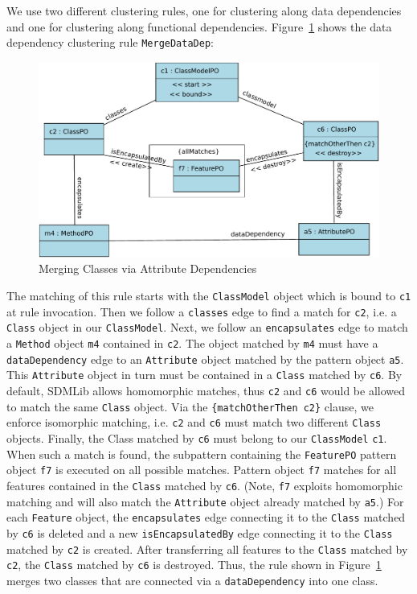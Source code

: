 \documentclass[submission,copyright,creativecommons]{eptcs}
\begin{document}
We use two different clustering rules, one for clustering along data dependencies 
and one for clustering along functional dependencies. Figure~\ref{fig:MergeAttributeRule} 
shows the data dependency clustering rule \texttt{MergeDataDep}: 

\begin{figure}[ht] \centering
	\includegraphics[width=\linewidth]{images/RuleMergeDataDep.pdf}
 \caption{Merging Classes via Attribute Dependencies}
 \label{fig:MergeAttributeRule}
\end{figure}  

The matching of this rule starts with the \texttt{ClassModel} object which 
is bound to \texttt{c1} at rule invocation. Then we follow a \texttt{classes}
 edge to find a match for \texttt{c2}, i.e. a \texttt{Class} object in our 
\texttt{ClassModel}. Next, we follow an \texttt{encapsulates} edge to match 
a \texttt{Method} object \texttt{m4} contained in \texttt{c2}. The object 
matched by \texttt{m4} must have a \texttt{dataDependency} edge to an \texttt
{Attribute} object matched by the pattern object \texttt{a5}. This 
\texttt{Attribute} object in turn must be contained in a \texttt{Class} matched by 
\texttt{c6}. By default, SDMLib allows homomorphic matches, thus \texttt{c2} 
and \texttt{c6} would be allowed to match the same \texttt{Class} object. 
Via the \texttt{\{matchOtherThen c2\}} clause, we enforce isomorphic 
matching, i.e. \texttt{c2} and \texttt{c6} must match two different 
\texttt{Class} objects. Finally, the Class matched by \texttt{c6} must belong to our 
\texttt{ClassModel} \texttt{c1}. When such a match is found, the subpattern 
containing the \texttt{FeaturePO} pattern object \texttt{f7} is executed on 
all possible matches. Pattern object \texttt{f7} matches for all features 
contained in the \texttt{Class} matched by \texttt{c6}. (Note, \texttt{f7} 
exploits homomorphic matching and will also match the \texttt{Attribute} 
object already matched by \texttt{a5}.) For each \texttt{Feature} object, 
the \texttt{encapsulates} edge connecting it to the \texttt{Class} matched 
by \texttt{c6} is deleted and a new \texttt{isEncapsulatedBy} edge 
connecting it to the \texttt{Class} matched by \texttt{c2} is created. After 
transferring all features to the \texttt{Class} matched by \texttt{c2}, the 
\texttt{Class} matched by \texttt{c6} is destroyed. Thus, the rule shown in 
Figure~\ref{fig:MergeAttributeRule} merges two classes that are connected 
via a \texttt{dataDependency} into one class. 
\end{document}
